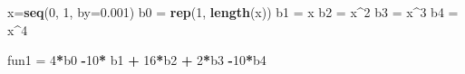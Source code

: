 \documentclass[
]{book}
\newenvironment{Shaded}{\begin{snugshade}}{\end{snugshade}}
\newcommand{\AttributeTok}[1]{\textcolor[rgb]{0.13,0.29,0.53}{#1}}
\newcommand{\DecValTok}[1]{\textcolor[rgb]{0.00,0.00,0.81}{#1}}
\newcommand{\FloatTok}[1]{\textcolor[rgb]{0.00,0.00,0.81}{#1}}
\newcommand{\FunctionTok}[1]{\textcolor[rgb]{0.13,0.29,0.53}{\textbf{#1}}}
\newcommand{\NormalTok}[1]{#1}
\newcommand{\OtherTok}[1]{\textcolor[rgb]{0.56,0.35,0.01}{#1}}
\newcommand{\SpecialCharTok}[1]{\textcolor[rgb]{0.81,0.36,0.00}{\textbf{#1}}}
\begin{document}
\begin{Shaded}
\begin{Highlighting}[]
\NormalTok{x}\OtherTok{=}\FunctionTok{seq}\NormalTok{(}\DecValTok{0}\NormalTok{, }\DecValTok{1}\NormalTok{, }\AttributeTok{by=}\FloatTok{0.001}\NormalTok{)}
\NormalTok{b0 }\OtherTok{=} \FunctionTok{rep}\NormalTok{(}\DecValTok{1}\NormalTok{, }\FunctionTok{length}\NormalTok{(x))}
\NormalTok{b1 }\OtherTok{=}\NormalTok{ x}
\NormalTok{b2 }\OtherTok{=}\NormalTok{ x}\SpecialCharTok{\^{}}\DecValTok{2}
\NormalTok{b3 }\OtherTok{=}\NormalTok{ x}\SpecialCharTok{\^{}}\DecValTok{3}
\NormalTok{b4 }\OtherTok{=}\NormalTok{ x}\SpecialCharTok{\^{}}\DecValTok{4}

\NormalTok{fun1 }\OtherTok{=} \DecValTok{4}\SpecialCharTok{*}\NormalTok{b0 }\SpecialCharTok{{-}}\DecValTok{10}\SpecialCharTok{*}\NormalTok{ b1 }\SpecialCharTok{+} \DecValTok{16}\SpecialCharTok{*}\NormalTok{b2 }\SpecialCharTok{+} \DecValTok{2}\SpecialCharTok{*}\NormalTok{b3 }\SpecialCharTok{{-}}\DecValTok{10}\SpecialCharTok{*}\NormalTok{b4}


\end{Highlighting}
\end{Shaded}
\end{document}
